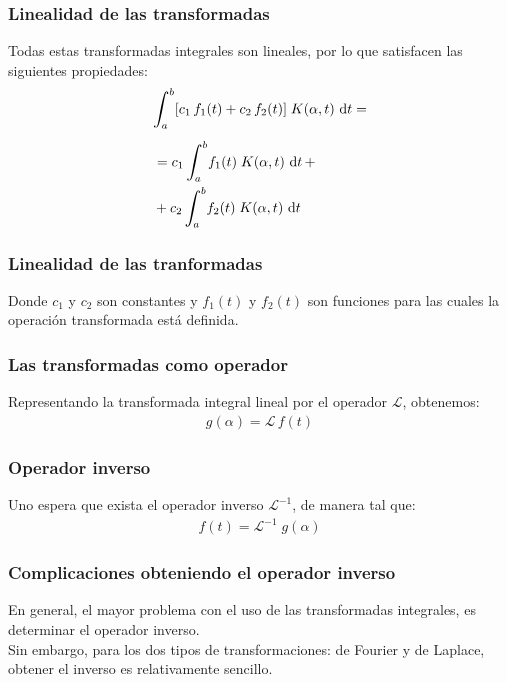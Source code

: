 \documentclass[12pt]{beamer}
\begin{document}
\begin{frame}
\frametitle{Linealidad de las transformadas}
Todas estas transformadas integrales son lineales, por lo que satisfacen las siguientes propiedades:
\pause
\begin{align}
\begin{aligned}[b]
&\scaleint{6ex}_{\bs a}^{b} [ c_{1} \, f_{1} (t) + c_{2} \, f_{2} (t)] \; K(\alpha, t) \, \dd{t} = \\[0.5em] 
&= c_{1} \, \scaleint{6ex}_{\bs a}^{b} f_{1} (t) \; K (\alpha, t) \, \dd{t} + \\
&+ c_{2} \, \scaleint{6ex}_{\bs a}^{b} f_{2} (t) \; K (\alpha, t) \, \dd{t}
\end{aligned}
\label{eq:ecuacion_15_08} 
\end{align}
\end{frame}
\begin{frame}
\frametitle{Linealidad de las tranformadas}
Donde $c_{1}$ y $c_{2}$ son constantes y $f_{1} (t)$ y $f_{2} (t)$ son funciones para las cuales la operación transformada está definida.
\end{frame}
\begin{frame}
\frametitle{Las transformadas como operador}
Representando la transformada integral lineal por el operador $\mathcal{L}$, obtenemos:
\pause
\begin{align}
g (\alpha) = \mathcal{L} \, f (t)
\label{eq:ecuacion_15_10}
\end{align}
\end{frame}
\begin{frame}
\frametitle{Operador inverso}
Uno espera que exista el operador inverso $\mathcal{L}^{-1}$, de manera tal que:
\pause
\begin{align}
f (t) = \mathcal{L}^{-1}  \; g (\alpha)
\label{eq:ecuacion_15_11}
\end{align}
\end{frame}
\begin{frame}
\frametitle{Complicaciones obteniendo el operador inverso}
En general, el mayor problema con el uso de las transformadas integrales, es determinar el operador inverso.
\\
\bigskip
\pause
Sin embargo, para los dos tipos de transformaciones: de Fourier y de Laplace, obtener el inverso es relativamente sencillo.
\end{frame}
\end{document}
